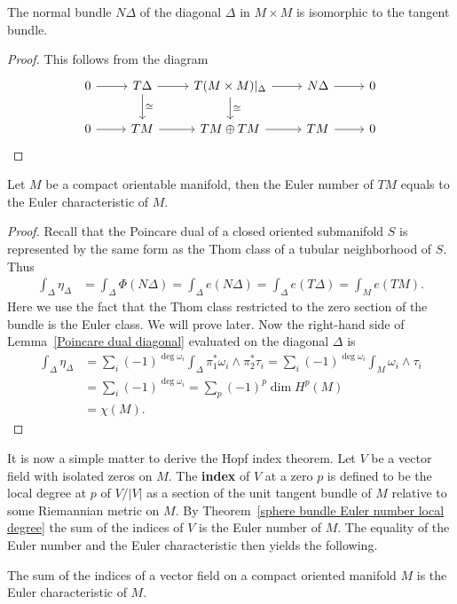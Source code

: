 \begin{lemma}
The normal bundle $N\Delta$ of the diagonal $\Delta$ in $M\times M$ is isomorphic to the tangent bundle.
\end{lemma}
\begin{proof}
This follows from the diagram
\[\begin{tikzcd}
0\ar[r]&T\Delta\ar[r]\ar[d,"\cong"]&T(M\times M)|_{\Delta}\ar[r]\ar[d,"\cong"]&N\Delta\ar[r]&0\\
0\ar[r]&TM\ar[r]&TM\oplus TM\ar[r]&TM\ar[r]&0
\end{tikzcd}\]
\end{proof}
\begin{theorem}\label{Euler number Euler char}
Let $M$ be a compact orientable manifold, then the Euler number of $TM$ equals to the Euler characteristic of $M$.
\end{theorem}
\begin{proof}
Recall that the Poincare dual of a closed oriented submanifold $S$ is represented by the same form as the Thom class of a tubular neighborhood of $S$. Thus
\begin{align*}
\int_{\Delta}\eta_{\Delta}&=\int_{\Delta}\Phi(N\Delta)=\int_{\Delta}e(N\Delta)=\int_{\Delta}e(T\Delta)=\int_Me(TM).
\end{align*}
Here we use the fact that the Thom class restricted to the zero section of the bundle is the Euler class. We will prove later. Now the right-hand side of 
Lemma~\ref{Poincare dual diagonal} evaluated on the diagonal $\Delta$ is
\begin{align*}
\int_\Delta\eta_{\Delta}&=\sum_i(-1)^{\deg\omega_i}\int_{\Delta}\pi_1^*\omega_i\wedge\pi_2^*\tau_i=\sum_i(-1)^{\deg\omega_i}\int_{M}\omega_i\wedge\tau_i\\
&=\sum_i(-1)^{\deg\omega_i}=\sum_p(-1)^p\dim H^p(M)\\
&=\chi(M).
\end{align*}
\end{proof}
It is now a simple matter to derive the Hopf index theorem. Let $V$ be a vector field with isolated zeros on $M$. The \textbf{index} of $V$ at a zero $p$ is defined to 
be the local degree at $p$ of $V/|V|$ as a section of the unit tangent bundle of $M$ relative to some Riemannian metric on $M$. By Theorem~\ref{sphere bundle Euler number local degree} 
the sum of the indices of $V$ is the Euler number of $M$. The equality of the Euler number and the Euler characteristic then yields the following.
\begin{theorem}
The sum of the indices of a vector field on a compact oriented manifold $M$ is the Euler characteristic of $M$.
\end{theorem}
